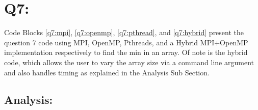 \documentclass[11pt]{article}
\begin{document}
\newpage
\section*{Q7:}

Code Blocks \ref{q7:mpi}, \ref{q7:openmp}, \ref{q7:pthread}, and \ref{q7:hybrid} present the question 7 code using MPI, OpenMP, Pthreads, and a Hybrid MPI+OpenMP implementation respectively to find the min in an array.
Of note is the hybrid code, which allows the user to vary the array size via a command line argument and also handles timing as explained in the Analysis Sub Section.






\subsection*{Analysis:}
\end{document}

